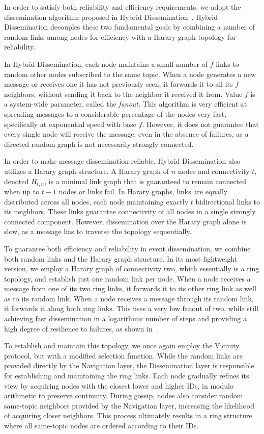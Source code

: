 In order to satisfy both reliability and efficiency requirements, we adopt the dissemination algorithm proposed in Hybrid Dissemination~\cite{HybridDissemination}.
Hybrid Dissemination decouples these two fundamental goals by combining a number of random links among nodes for efficiency with a Harary graph
topology for reliability.

In Hybrid Dissemination, each node maintains a small number of $f$ links to random other nodes subscribed to the same topic.
When a node generates a new message or receives one it has not previously seen, it forwards it to all its $f$ neighbors, without
sending it back to the neighbor it received it from.
Value $f$ is a system-wide parameter, called the \emph{fanout}.
This algorithm is very efficient at spreading messages to a considerable percentage of the nodes very fast, specifically at exponential
speed with base $f$.
However, it does not guarantee that every single node will receive the message, even in the absence of failures, as a directed random graph is not necessarily strongly connected.

In order to make message dissemination reliable, Hybrid Dissemination also utilizes a Harary graph structure.
A Harary graph of $n$ nodes and connectivity $t$, denoted   $H_{t,n}$, is a minimal link graph that is guaranteed to remain connected when up to $t-1$ nodes or links fail.
In Harary graphs, links are equally distributed across all nodes, each node maintaining exactly $t$ bidirectional links to its neighbors.
These links guarantee connectivity of all nodes in a single strongly connected component.
However, dissemination over the Harary graph alone is slow, as a message has to traverse the topology sequentially.

To guarantee both efficiency and reliability in event dissemination, we combine both random links and the Harary graph structure.
In its most lightweight version, we employ a Harary graph of connectivity two, which essentially is a ring topology, and establish just one random link per node.
When a node receives a message from one of its two ring links, it forwards it to its other ring link as well as to its random link.
When a node receives a message through its random link, it forwards it along both ring links.
This uses a very low   fanout of two, while still achieving fast dissemination in a logarithmic number of steps and providing a high degree of resilience to failures, as shown in~\cite{HybridDissemination}.

To establish and maintain this topology, we once again employ the Vicinity protocol, but with a modified selection function.
While the random links are provided directly by the Navigation layer, the Dissemination layer is responsible for establishing and maintaining the ring links.
Each node gradually refines its view by acquiring nodes with the closest lower and higher IDs, in modulo arithmetic to preserve continuity.
During gossip, nodes also consider random same-topic neighbors provided by the Navigation layer, increasing the likelihood of acquiring closer neighbors.
This process ultimately results in a ring structure where all same-topic nodes are ordered according to their IDs.

